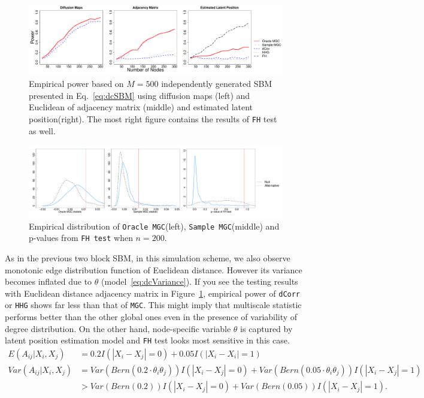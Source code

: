 \documentclass[12pt]{article}
\theoremstyle{definition}
\begin{document}
\begin{figure}[h]
	\centering
	\includegraphics[width=6in]{../Figure/dcSBM.pdf}
	\caption{Empirical power based on $M = 500$ independently generated SBM presented in Eq.~\ref{eq:dcSBM} using diffusion maps (left) and Euclidean of adjacency matrix (middle)  and estimated latent position(right). The most right figure contains the results of \texttt{FH} test as well.}
		\label{fig:dcSBM}
\end{figure}	


\begin{figure}[H]
	\centering
	\includegraphics[width=6in]{../Figure/dcSBM_density.pdf}
	\caption{Empirical distribution of \texttt{Oracle MGC}(left), \texttt{Sample MGC}(middle) and p-values from \texttt{FH test} when $n=200$.}
	\label{fig:dcSBM_density}
\end{figure}


As in the previous two block SBM, in this simulation scheme, we also observe monotonic edge distribution function of Euclidean distance. However its variance becomes inflated due to $\theta$ (model~\ref{eq:dcVariance}). If you see the testing results with Euclidean distance adjacency matrix in Figure~\ref{fig:dcSBM}, empirical power of \texttt{dCorr} or \texttt{HHG} shows far less than that of \texttt{MGC}. This might imply that multiscale statistic performs better than the other global ones even in the presence of variability of degree distribution. On the other hand, node-specific variable $\theta$ is captured by latent position estimation model \citep{fosdick2015testing} and \texttt{FH} test looks most sensitive in this case. 
\begin{equation}
\begin{aligned}
E(A_{ij} | X_{i}, X_{j}) &  =  0.2 I(|X_{i} - X_{j}| = 0) + 0.05 I(|X_{i} - X_{i}| = 1) \\
Var(A_{ij} | X_{i}, X_{j}) & = Var( Bern(0.2 \cdot \theta_{i} \theta_{j})) I(|X_{i} - X_{j}| = 0) +
Var( Bern(0.05 \cdot \theta_{i} \theta_{j}) ) I( |X_{i} - X_{j}| = 1) \\
& > Var(Bern(0.2)) I(|X_{i} - X_{j}| = 0) + Var(Bern(0.05)) I(|X_{i} - X_{j}| = 1).
\end{aligned}
\label{eq:dcVariance}
\end{equation}	
	
\end{document}
